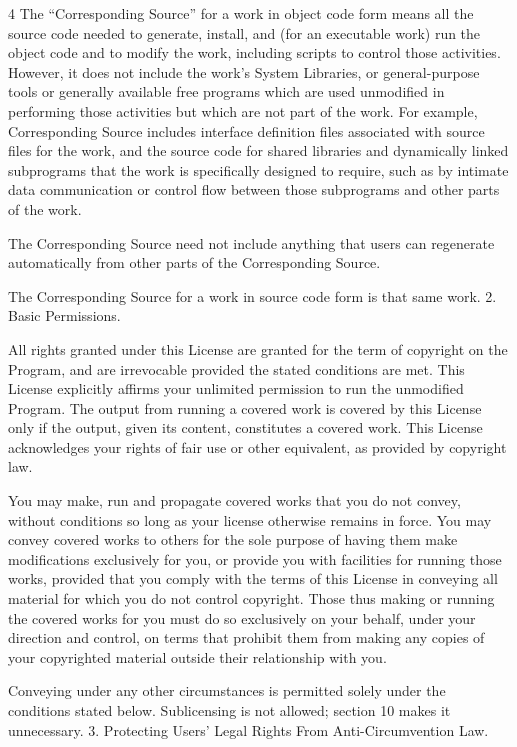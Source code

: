 \documentclass[fontsize=11pt,paper=A4,BCOR=12mm,DIV=13,open=any,listof=totoc,toc=flat]{scrbook}
\begin{document}
{\begin{multicols}{4}
The “Corresponding Source” for a work in object code form means all the source code needed to generate, install, and (for an executable work) run the object code and to modify the work, including scripts to control those activities. However, it does not include the work's System Libraries, or general-purpose tools or generally available free programs which are used unmodified in performing those activities but which are not part of the work. For example, Corresponding Source includes interface definition files associated with source files for the work, and the source code for shared libraries and dynamically linked subprograms that the work is specifically designed to require, such as by intimate data communication or control flow between those subprograms and other parts of the work.

The Corresponding Source need not include anything that users can regenerate automatically from other parts of the Corresponding Source.

The Corresponding Source for a work in source code form is that same work.
2. Basic Permissions.

All rights granted under this License are granted for the term of copyright on the Program, and are irrevocable provided the stated conditions are met. This License explicitly affirms your unlimited permission to run the unmodified Program. The output from running a covered work is covered by this License only if the output, given its content, constitutes a covered work. This License acknowledges your rights of fair use or other equivalent, as provided by copyright law.

You may make, run and propagate covered works that you do not convey, without conditions so long as your license otherwise remains in force. You may convey covered works to others for the sole purpose of having them make modifications exclusively for you, or provide you with facilities for running those works, provided that you comply with the terms of this License in conveying all material for which you do not control copyright. Those thus making or running the covered works for you must do so exclusively on your behalf, under your direction and control, on terms that prohibit them from making any copies of your copyrighted material outside their relationship with you.

Conveying under any other circumstances is permitted solely under the conditions stated below. Sublicensing is not allowed; section 10 makes it unnecessary.
3. Protecting Users' Legal Rights From Anti-Circumvention Law.


\end{multicols}}
\end{document}

